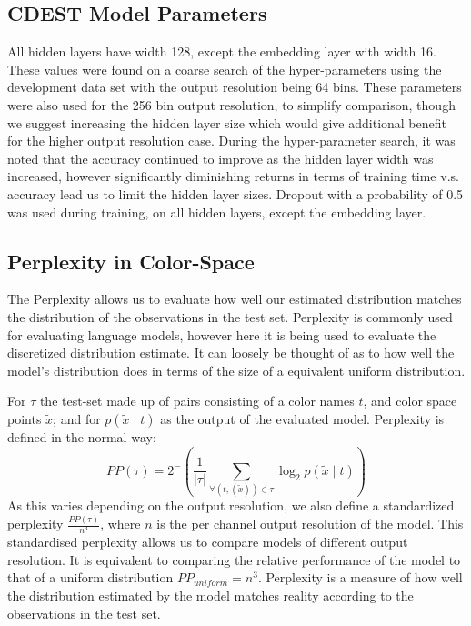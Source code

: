 \documentclass[11pt,letterpaper, twocolumn]{article}
\newcommand{\parencite}{\citep}
\begin{document}
\subsection{CDEST Model Parameters}
All hidden layers have width 128, except the embedding layer with width 16.
These values were found on a coarse search of the hyper-parameters using the development data set with the output resolution being 64 bins.
These parameters were also used for the 256 bin output resolution, to simplify comparison, though we suggest increasing the hidden layer size which would give additional benefit for the higher output resolution case.
During the hyper-parameter search, it was noted that the accuracy continued to improve as the hidden layer width was increased,
however significantly diminishing returns in terms of training time v.s. accuracy lead us to limit the hidden layer sizes.
Dropout \parencite{srivastava2014dropout} with a probability of 0.5 was used during training, on all hidden layers, except the embedding layer.


\subsection{Perplexity in Color-Space}
The Perplexity allows us to evaluate how well our estimated distribution matches the distribution of the observations in the test set.
Perplexity is commonly used for evaluating language models, however here it is being used to evaluate the discretized distribution estimate.
It can loosely be thought of as to how well the model's distribution does in terms of the size of a equivalent uniform distribution.

For $\tau$ the test-set made up of pairs consisting of a color names $t$, and color space points $\tilde{x}$;
and for $p(\tilde{x}\mid t)$ as the output of the evaluated model.
Perplexity is defined in the normal way:
\[
 PP(\tau) = 2^-{\left(
 	\frac{1}{|\tau|} 
 	\sum_{
	 		\forall(t,(\tilde{x})) \in \tau}
 	 \log_2 p(\tilde{x}\mid t)\right)}
\]
As this varies depending on the output resolution,
we also define a standardized perplexity $\frac{PP(\tau)}{n^3}$, where $n$ is the per channel output resolution of the model.
This standardised perplexity allows us to compare models of different output resolution.
It is equivalent to comparing the relative performance of the model to that of a uniform distribution $PP_{uniform}=n^3$.
Perplexity is a measure of how well the distribution estimated by the model matches reality according to the observations in the test set.
\end{document}
